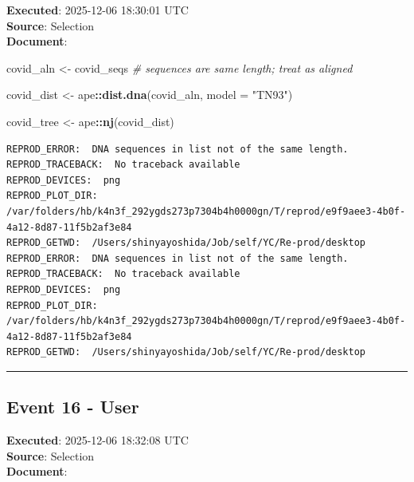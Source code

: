 \documentclass[
  11pt,
]{article}
\newenvironment{Shaded}{\begin{snugshade}}{\end{snugshade}}
\newcommand{\AttributeTok}[1]{\textcolor[rgb]{0.13,0.29,0.53}{#1}}
\newcommand{\CommentTok}[1]{\textcolor[rgb]{0.56,0.35,0.01}{\textit{#1}}}
\newcommand{\FunctionTok}[1]{\textcolor[rgb]{0.13,0.29,0.53}{\textbf{#1}}}
\newcommand{\NormalTok}[1]{#1}
\newcommand{\OtherTok}[1]{\textcolor[rgb]{0.56,0.35,0.01}{#1}}
\newcommand{\SpecialCharTok}[1]{\textcolor[rgb]{0.81,0.36,0.00}{\textbf{#1}}}
\newcommand{\StringTok}[1]{\textcolor[rgb]{0.31,0.60,0.02}{#1}}
\newenvironment{rpoutput}{\vspace{0.5em}\begin{snugshade}}{\end{snugshade}}
\begin{document}
\textbf{Executed}: 2025-12-06 18:30:01 UTC\\
\textbf{Source}: Selection\\
\textbf{Document}:

\begin{Shaded}
\begin{Highlighting}[]
\NormalTok{covid\_aln }\OtherTok{\textless{}{-}}\NormalTok{ covid\_seqs  }\CommentTok{\# sequences are same length; treat as aligned}

\NormalTok{covid\_dist }\OtherTok{\textless{}{-}}\NormalTok{ ape}\SpecialCharTok{::}\FunctionTok{dist.dna}\NormalTok{(covid\_aln, }\AttributeTok{model =} \StringTok{"TN93"}\NormalTok{)}

\NormalTok{covid\_tree }\OtherTok{\textless{}{-}}\NormalTok{ ape}\SpecialCharTok{::}\FunctionTok{nj}\NormalTok{(covid\_dist)}
\end{Highlighting}
\end{Shaded}

\begin{rpoutput}

\begin{verbatim}
REPROD_ERROR:  DNA sequences in list not of the same length. 
REPROD_TRACEBACK:  No traceback available  
REPROD_DEVICES:  png 
REPROD_PLOT_DIR:  /var/folders/hb/k4n3f_292ygds273p7304b4h0000gn/T/reprod/e9f9aee3-4b0f-4a12-8d87-11f5b2af3e84 
REPROD_GETWD:  /Users/shinyayoshida/Job/self/YC/Re-prod/desktop 
REPROD_ERROR:  DNA sequences in list not of the same length. 
REPROD_TRACEBACK:  No traceback available  
REPROD_DEVICES:  png 
REPROD_PLOT_DIR:  /var/folders/hb/k4n3f_292ygds273p7304b4h0000gn/T/reprod/e9f9aee3-4b0f-4a12-8d87-11f5b2af3e84 
REPROD_GETWD:  /Users/shinyayoshida/Job/self/YC/Re-prod/desktop 
\end{verbatim}

\end{rpoutput}

\begin{center}\rule{0.5\linewidth}{0.5pt}\end{center}

\subsection{Event 16 - User}\label{event-16---user}

\textbf{Executed}: 2025-12-06 18:32:08 UTC\\
\textbf{Source}: Selection\\
\textbf{Document}:
\end{document}
